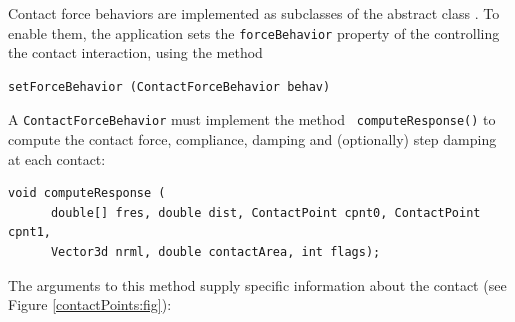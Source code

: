Contact force behaviors are implemented as subclasses of the abstract
class
.
To enable them, the application sets the {\tt forceBehavior} property
of the 
controlling the contact interaction, using the method
%
\begin{lstlisting}[]
  setForceBehavior (ContactForceBehavior behav)
\end{lstlisting}
%
A {\tt ContactForceBehavior} must implement the method {\tt
computeResponse()} to compute the contact force, compliance, damping
and (optionally) step damping at each contact:
%
\begin{lstlisting}[]
  void computeResponse (
      double[] fres, double dist, ContactPoint cpnt0, ContactPoint cpnt1,
      Vector3d nrml, double contactArea, int flags);
\end{lstlisting}
%
The arguments to this method supply specific information about the
contact (see Figure \ref{contactPoints:fig}):

